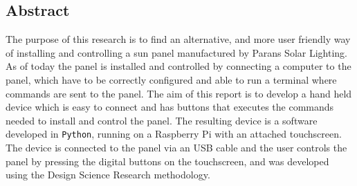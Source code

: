 \documentclass[a4paper]{article}
\begin{document}
    \subsection*{Abstract} %
    \label{sub:abstract}
            The purpose of this research is to find an alternative, and more user friendly way of installing and controlling a sun panel manufactured by Parans Solar Lighting. As of today the panel is installed and controlled by connecting a computer to the panel, which have to be correctly configured and able to run a terminal where commands are sent to the panel. The aim of this report is to develop a hand held device which is easy to connect and has buttons that executes the commands needed to install and control the panel. The resulting device is a software developed in \texttt{Python}, running on a Raspberry Pi with an attached touchscreen. The device is connected to the panel via an USB cable and the user controls the panel by pressing the digital buttons on the touchscreen, and was developed using the Design Science Research methodology.

    
\end{document}
